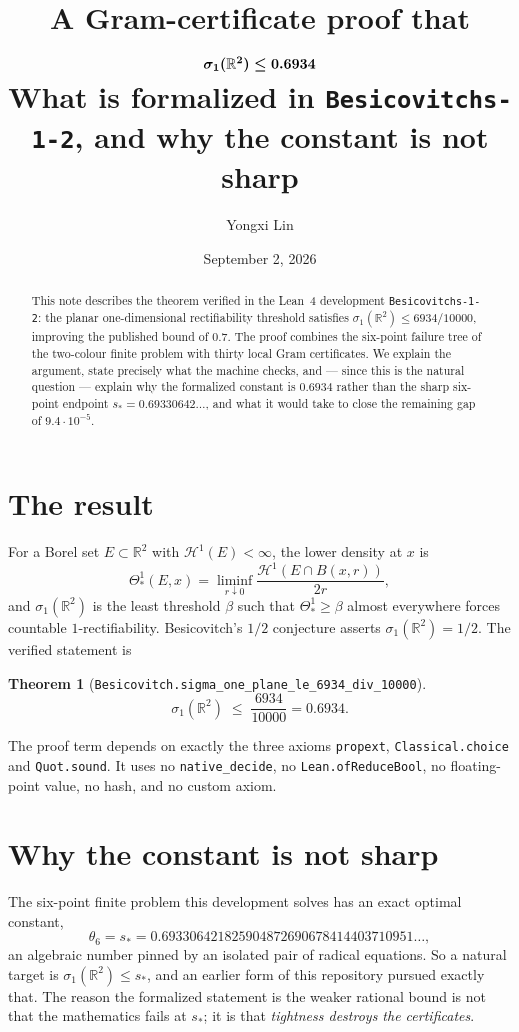 \documentclass[11pt]{article}
\title{\bfseries A Gram-certificate proof that\\[0.2em]
$\boldsymbol{\sigma_1(\R^2)\le 0.6934}$\\[0.6em]
\large What is formalized in \texttt{Besicovitchs-1-2}, and why the constant is not sharp}
\author{Yongxi Lin}
\date{September 2, 2026}
\newtheorem{theorem}{Theorem}[section]
\newcommand{\R}{\mathbb{R}}
\begin{document}
\maketitle

\begin{abstract}
This note describes the theorem verified in the Lean~4 development
\texttt{Besicovitchs-1-2}: the planar one-dimensional rectifiability threshold satisfies
$\sigma_1(\R^2)\le 6934/10000$, improving the published bound of $0.7$. The proof combines the
six-point failure tree of the two-colour finite problem with thirty local Gram certificates. We
explain the argument, state precisely what the machine checks, and — since this is the natural
question — explain why the formalized constant is $0.6934$ rather than the sharp six-point
endpoint $s_*=0.69330642\ldots$, and what it would take to close the remaining gap of
$9.4\cdot10^{-5}$.
\end{abstract}

\section{The result}

For a Borel set $E\subset\R^2$ with $\mathcal H^1(E)<\infty$, the lower density at $x$ is
\[
\Theta^1_*(E,x)=\liminf_{r\downarrow0}\frac{\mathcal H^1(E\cap B(x,r))}{2r},
\]
and $\sigma_1(\R^2)$ is the least threshold $\beta$ such that $\Theta^1_*\ge\beta$ almost
everywhere forces countable $1$-rectifiability. Besicovitch's $1/2$ conjecture asserts
$\sigma_1(\R^2)=1/2$. The verified statement is

\begin{theorem}[\texttt{Besicovitch.sigma\_one\_plane\_le\_6934\_div\_10000}]
\[
\sigma_1(\R^2)\;\le\;\frac{6934}{10000}=0.6934 .
\]
\end{theorem}

The proof term depends on exactly the three axioms \texttt{propext}, \texttt{Classical.choice} and
\texttt{Quot.sound}. It uses no \texttt{native\_decide}, no \texttt{Lean.ofReduceBool}, no
floating-point value, no hash, and no custom axiom.

\section{Why the constant is not sharp}
\label{sec:why}

The six-point finite problem this development solves has an exact optimal constant,
\[
\theta_6=s_*=0.693306421825904872690678414403710951\ldots,
\]
an algebraic number pinned by an isolated pair of radical equations. So a natural target is
$\sigma_1(\R^2)\le s_*$, and an earlier form of this repository pursued exactly that. The reason
the formalized statement is the weaker rational bound is not that the mathematics fails at $s_*$;
it is that \emph{tightness destroys the certificates}.
\end{document}
